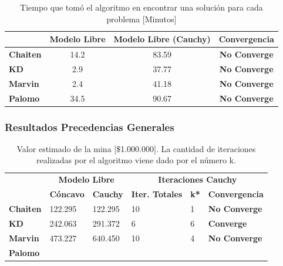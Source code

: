 \documentclass[12pt,letterpaper]{article}
\begin{document}
\begin{table}[H]
\centering
\begin{tabular}{|l|ccc|}
\hline
                 & \textbf{Modelo Libre} & \textbf{Modelo Libre (Cauchy)} & \textbf{Convergencia}  \\ \hline
\textbf{Chaiten} & 14.2                &  83.59            & \textbf{No Converge}                              \\ \hline
\textbf{KD}      & 2.9                   &  37.77              & \textbf{No Converge}                                     \\ \hline
\textbf{Marvin}  & 2.4                 & 41.18              & \textbf{No Converge}                                    \\ \hline
\textbf{Palomo}  & 34.5                 &    90.67           &      \textbf{No Converge}                              \\ \hline
\end{tabular}
\caption{Tiempo que tomó el algoritmo en encontrar una solución para cada problema
[Minutos]}
\end{table}



\subsubsection{Resultados Precedencias Generales}

\begin{table}[H]
\centering
\begin{tabular}{|l|ll|lll|}
\hline
                 & \multicolumn{2}{c|}{\textbf{Modelo Libre}} & \multicolumn{3}{c|}{\textbf{Iteraciones Cauchy}}                   \\ \cline{2-6} 
                 & \textbf{Cóncavo}         & \textbf{Cauchy}       & \textbf{Iter. Totales} & \textbf{k*} & \textbf{Convergencia} \\ \hline
\textbf{Chaiten} &     122.295             & 122.295          & 10                           & 1           & \textbf{No Converge}           \\ \hline
\textbf{KD}      &     242.063             & 291.372            &       6                    & 6          & \textbf{Converge}              \\ \hline
\textbf{Marvin}  &     473.227           & 640.450              & 10                         & 4           & \textbf{No Converge}           \\ \hline
\textbf{Palomo}  &                 &                        &                              &             & \textbf{}         \\ \hline
\end{tabular}
\caption{Valor estimado de la mina [\$1.000.000]. La cantidad de iteraciones realizadas por el algoritmo viene dado por el número k.}
\end{table}
\end{document}
